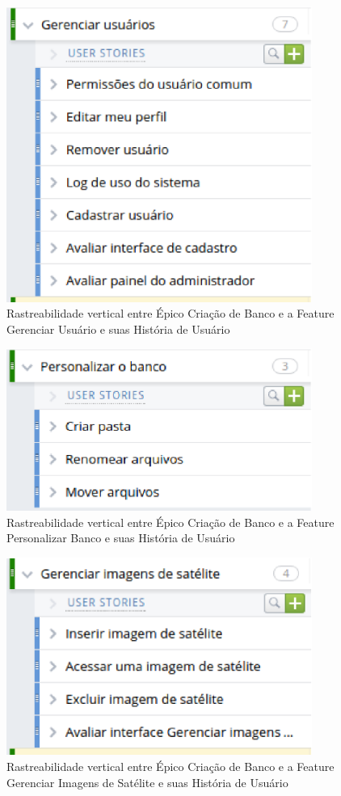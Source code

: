   \begin{figure}[!htb]
    \centering
    \includegraphics[width=10cm, keepaspectratio=false]{figuras/rastreabilidade/vertical/feature_gerenciar_usuario.eps}
    \caption{Rastreabilidade vertical entre Épico Criação de Banco e a Feature Gerenciar Usuário e suas História de Usuário}
  \end{figure}

  \begin{figure}[!htb]
    \centering
    \includegraphics[width=10cm, keepaspectratio=false]{figuras/rastreabilidade/vertical/feature_personalizar_banco.eps}
    \caption{Rastreabilidade vertical entre Épico Criação de Banco e a Feature Personalizar Banco e suas História de Usuário}
  \end{figure}

  \begin{figure}[!htb]
    \centering
    \includegraphics[width=10cm, keepaspectratio=false]{figuras/rastreabilidade/vertical/feature_gerenciar_imagens.eps}
    \caption{Rastreabilidade vertical entre Épico Criação de Banco e a Feature Gerenciar Imagens de Satélite e suas História de Usuário}
  \end{figure}

